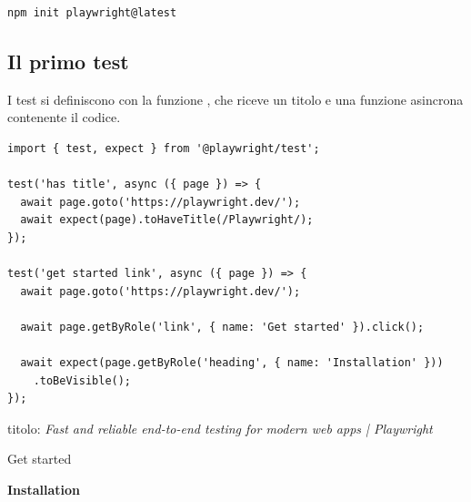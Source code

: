 \begin{lstlisting}[style=shell]
npm init playwright@latest
\end{lstlisting}

\subsection{Il primo test}

I test si definiscono con la funzione , che riceve un titolo e una
funzione asincrona contenente il codice.

\begin{affianco}[0.53][c]
\codicepiccolo
\begin{lstlisting}[style=ts, name=example.spec.ts]
import { test, expect } from '@playwright/test';

test('has title', async ({ page }) => {
  await page.goto('https://playwright.dev/');
  await expect(page).toHaveTitle(/Playwright/);
});

test('get started link', async ({ page }) => {
  await page.goto('https://playwright.dev/');

  await page.getByRole('link', { name: 'Get started' }).click();

  await expect(page.getByRole('heading', { name: 'Installation' }))
    .toBeVisible();
});
\end{lstlisting}
\risultato
\begin{browser}
  {\wtuifont\color{neutral!45!black}titolo: \textit{Fast and reliable end-to-end testing
   for modern web apps | Playwright}\par}\vspace{4pt}
  \colorbox{green-gradient-6!85!black}{\color{white}\Lato\footnotesize Get started}
  \wtpuntatore
\end{browser}
\begin{browser}
  {\Lora\bfseries\Large Installation\par}
\end{browser}
\end{affianco}

